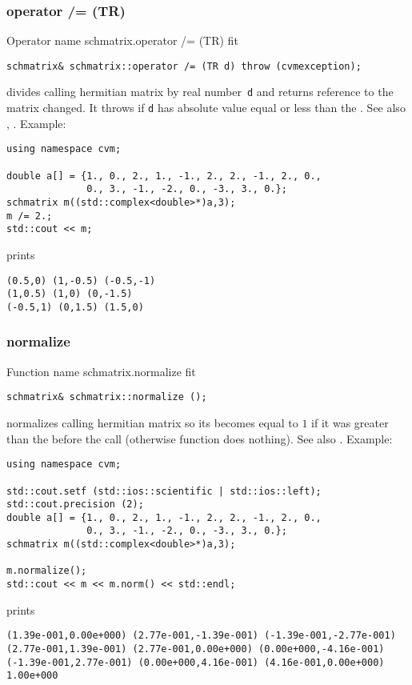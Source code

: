 \subsubsection{operator /= (TR)}
Operator%
\pdfdest name {schmatrix.operator /= (TR)} fit
\begin{verbatim}
schmatrix& schmatrix::operator /= (TR d) throw (cvmexception);
\end{verbatim}
divides  calling hermitian matrix by  real number~\verb"d"
and returns  reference to
the matrix changed.
It throws  
if \verb"d" has  absolute value equal or less
than the 
.
See also ,
.
Example:
\begin{Verbatim}
using namespace cvm;

double a[] = {1., 0., 2., 1., -1., 2., 2., -1., 2., 0.,
              0., 3., -1., -2., 0., -3., 3., 0.};
schmatrix m((std::complex<double>*)a,3);
m /= 2.;
std::cout << m;
\end{Verbatim}
prints
\begin{Verbatim}
(0.5,0) (1,-0.5) (-0.5,-1)
(1,0.5) (1,0) (0,-1.5)
(-0.5,1) (0,1.5) (1.5,0)
\end{Verbatim}
\newpage



\subsubsection{normalize}
Function%
\pdfdest name {schmatrix.normalize} fit
\begin{verbatim}
schmatrix& schmatrix::normalize ();
\end{verbatim}
normalizes  calling hermitian matrix so 
its 
becomes equal to $1$ if it was greater than the 
before the call (otherwise function does nothing).
See also .
Example:
\begin{Verbatim}
using namespace cvm;

std::cout.setf (std::ios::scientific | std::ios::left); 
std::cout.precision (2);
double a[] = {1., 0., 2., 1., -1., 2., 2., -1., 2., 0.,
              0., 3., -1., -2., 0., -3., 3., 0.};
schmatrix m((std::complex<double>*)a,3);

m.normalize();
std::cout << m << m.norm() << std::endl;
\end{Verbatim}
prints
\begin{Verbatim}
(1.39e-001,0.00e+000) (2.77e-001,-1.39e-001) (-1.39e-001,-2.77e-001)
(2.77e-001,1.39e-001) (2.77e-001,0.00e+000) (0.00e+000,-4.16e-001)
(-1.39e-001,2.77e-001) (0.00e+000,4.16e-001) (4.16e-001,0.00e+000)
1.00e+000
\end{Verbatim}
\newpage



